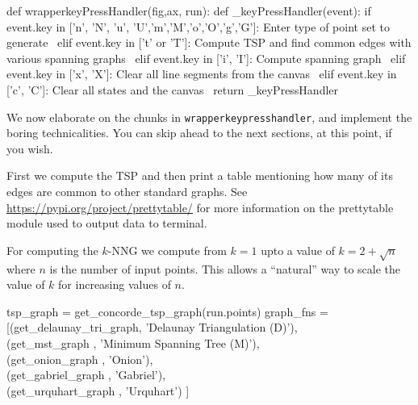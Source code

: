 \nwenddocs{}\plusendmoddef\nwstartdeflinemarkup{}\nwenddeflinemarkup
def wrapperkeyPressHandler(fig,ax, run): 
       def _keyPressHandler(event):
               if event.key in ['n', 'N', 'u', 'U','m','M','o','O','g','G']: 
                     \LA{}Enter type of point set to generate~{\nwtagstyle{}}\RA{}                   
               elif event.key in ['t' or 'T']:
                     \LA{}Compute TSP and find common edges with various spanning graphs~{\nwtagstyle{}}\RA{}
               elif event.key in ['i', 'I']:                     
                     \LA{}Compute spanning graph~{\nwtagstyle{}}\RA{}    
               elif event.key in ['x', 'X']:
                     \LA{}Clear all line segments from the canvas~{\nwtagstyle{}}\RA{}
               elif event.key in ['c', 'C']: 
                     \LA{}Clear all states and the canvas~{\nwtagstyle{}}\RA{}
       return _keyPressHandler
\nwendcode{}\nwdocspar

We now elaborate on the chunks in \verb|wrapperkeypresshandler|, and implement the boring technicalities. You 
can skip ahead to the next sections, at this point, if you wish. 

First we compute the TSP and then print a table mentioning how many of its edges are common to other
standard graphs. See \url{https://pypi.org/project/prettytable/} for more information on the 
prettytable module used to output data to terminal. 

For computing the $k$-NNG we compute from $k=1$ upto a value of $k=2+\sqrt{n}$ where $n$ is the number 
of input points. This allows a ``natural'' way to scale the value of $k$ for increasing values of $n$. 

\nwenddocs{}\endmoddef\nwstartdeflinemarkup{}\nwenddeflinemarkup
tsp_graph = get_concorde_tsp_graph(run.points)
graph_fns = [(get_delaunay_tri_graph, 'Delaunay Triangulation (D)'), \\
             (get_mst_graph         , 'Minimum Spanning Tree (M)'), \\
             (get_onion_graph       , 'Onion'),\\
             (get_gabriel_graph     , 'Gabriel'),\\
             (get_urquhart_graph    , 'Urquhart') ]

